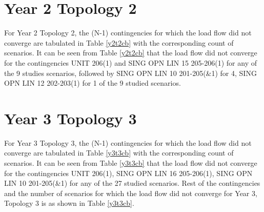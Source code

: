 \documentclass[10pt]{report}
\begin{document}
\section{Year 2 Topology 2}

For Year 2 Topology 2, the (N-1) contingencies for which the load flow did not converge are tabulated in Table \ref{y2t2cb} with the corresponding count of scenarios. It can be seen from Table \ref{y2t2cb} that the load flow did not converge for the contingencies UNIT 206(1) and SING OPN LIN   15 205-206(1) for any of the 9 studies scenarios, followed by SING OPN LIN   10 201-205(\&1) for  4, SING OPN LIN   12 202-203(1) for 1 of the 9 studied scenarios. 

\begin{table}[H]
\caption{Count of scenarios for which (N-1) contingencies failed to converge - Year 2, Topology 2}
\label{y2t2cb}


\centering
{}
\end{table}

\section{Year 3 Topology 3}

For Year 3 Topology 3, the (N-1) contingencies for which the load flow did not converge are tabulated in Table \ref{y3t3cb} with the corresponding count of scenarios. It can be seen from Table \ref{y3t3cb} that the load flow did not converge for the contingencies UNIT 206(1), SING OPN LIN   16 205-206(1), SING OPN LIN   10 201-205(\&1) for any of the 27 studied scenarios. Rest of the contingencies and the number of scenarios for which the load flow did not converge for Year 3, Topology 3 is as shown in Table \ref{y3t3cb}.  
\end{document}
